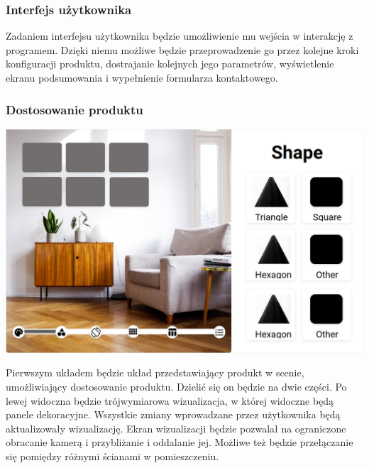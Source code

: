 \documentclass{article} %
\begin{document}
        \subsubsection{Interfejs użytkownika}
        Zadaniem interfejsu użytkownika będzie umożliwienie mu wejścia w interakcję z programem. Dzięki niemu możliwe będzie przeprowadzenie go przez kolejne kroki konfiguracji produktu, dostrajanie kolejnych jego parametrów, wyświetlenie ekranu podsumowania i wypełnienie formularza kontaktowego.
        \\
        
        
        \subsubsection*{Dostosowanie produktu}
        
        \begin{center}
        \includegraphics[scale=0.3,keepaspectratio=true]{images/diagrams/ui_mockup.png}
        \end{center}
        

        Pierwszym układem będzie układ przedstawiający produkt w scenie, umożliwiający dostosowanie produktu. Dzielić się on będzie na dwie części. Po lewej widoczna będzie trójwymiarowa wizualizacja, w której widoczne będą panele dekoracyjne. Wszystkie zmiany wprowadzane przez użytkownika będą aktualizowały wizualizację. Ekran wizualizacji będzie pozwalał na ograniczone obracanie kamerą i przybliżanie i oddalanie jej. Możliwe też będzie przełączanie się pomiędzy różnymi ścianami w pomieszczeniu.
        \\
        
\end{document}
